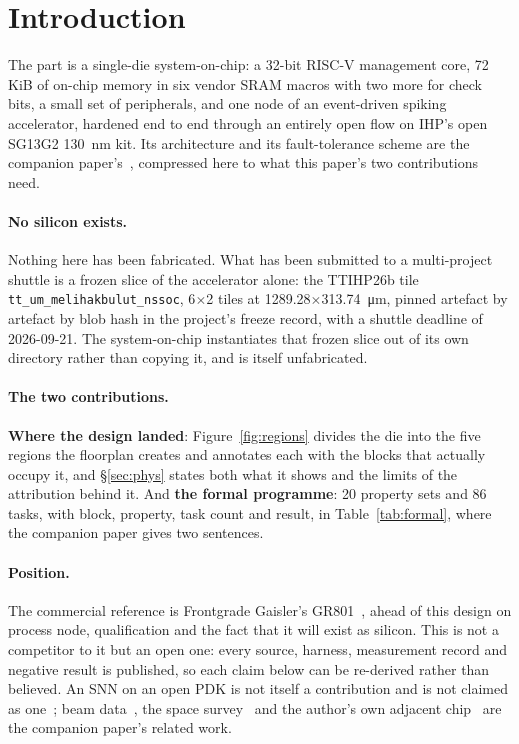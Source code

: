 \documentclass[11pt,a4paper]{article}
\newcommand{\file}[1]{\texttt{\small #1}}
\begin{document}
\section{Introduction}
\label{sec:intro}

The part is a single-die system-on-chip: a \num{32}-bit RISC-V
management core, \num{72}\,KiB of on-chip memory in six vendor SRAM
macros with two more for check bits, a small set of peripherals, and one node of an event-driven
spiking accelerator, hardened end to end through an entirely open flow
on IHP's open SG13G2 \SI{130}{\nano\meter} kit. Its architecture and
its fault-tolerance scheme are the companion
paper's~\cite{companion_design}, compressed here to what this paper's
two contributions need.

\paragraph{No silicon exists.} Nothing here has been fabricated. What
has been submitted to a multi-project shuttle is a frozen slice of the
accelerator alone: the TTIHP26b tile
\file{tt\_um\_\allowbreak melihakbulut\_\allowbreak nssoc},
\num{6}$\times$\num{2} tiles at
\SI{1289.28}{}$\times$\SI{313.74}{\um}, pinned artefact by
artefact by blob hash in the project's freeze record, with a shuttle
deadline of 2026-09-21. The system-on-chip instantiates that frozen
slice out of its own directory rather than copying it, and is itself
unfabricated.

\paragraph{The two contributions.} \textbf{Where the design landed}:
Figure~\ref{fig:regions} divides the die into the five regions the
floorplan creates and annotates each with the blocks that actually
occupy it, and \S\ref{sec:phys} states both what it shows and the
limits of the attribution behind it. And \textbf{the formal programme}:
\num{20} property sets and \num{86} tasks, with block, property, task
count and result, in Table~\ref{tab:formal}, where the companion paper
gives two sentences.

\paragraph{Position.} The commercial reference is Frontgrade Gaisler's
GR801~\cite{gr801}, ahead of this design on process node, qualification
and the fact that it will exist as silicon. This is not a competitor to
it but an open one: every source, harness, measurement record and
negative result is published, so each claim below can be re-derived
rather than believed. An SNN on an open PDK is not itself a
contribution and is not claimed as
one~\cite{openspike2023,kumaresan2026}; beam
data~\cite{nijsink2026,frenkel2019}, the space
survey~\cite{naoukin2023} and the author's own adjacent
chip~\cite{zirh2_2026} are the companion paper's related work.
\end{document}
